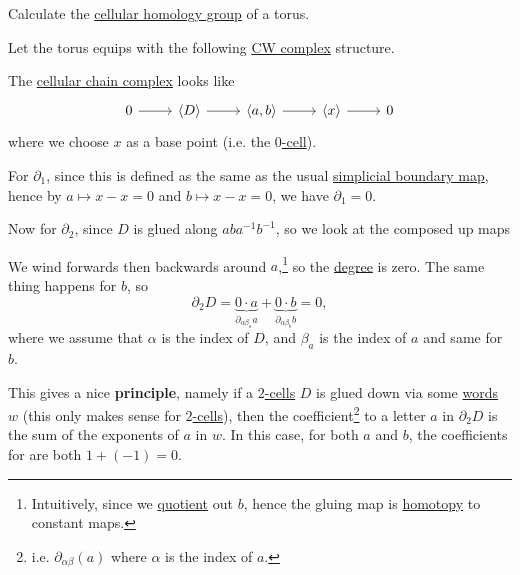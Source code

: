\begin{eg}
	Calculate the \hyperref[def:cellular-homology-group]{cellular homology group} of a torus.
\end{eg}
\begin{explanation}
	Let the torus equips with the following \hyperref[def:CW-Complex]{CW complex} structure.
	\begin{figure}[H]
		\centering
		\label{fig:eg:lec31:CW-complex-torus}
	\end{figure}

	The \hyperref[def:cellular-chain-complex]{cellular chain complex} looks like
	\[
		\begin{tikzcd}
			0 & {\left<D\right>} & {\left<a, b\right>} & {\left<x\right>} & 0
			\arrow[from=1-1, to=1-2]
			\arrow[from=1-2, to=1-3]
			\arrow[from=1-3, to=1-4]
			\arrow[from=1-4, to=1-5]
		\end{tikzcd}
	\]
	where we choose \(x\) as a base point (i.e. the \hyperref[def:cell]{\(0\)-cell}).

	For \(\partial _1\), since this is defined as the same as the usual \hyperref[def:boundary-homomorphism]{simplicial boundary map},
	hence by \(a \mapsto x - x = 0\) and \(b \mapsto x - x = 0\), we have \(\partial_1 = 0\).

	Now for \(\partial _2\), since \(D\) is glued along \(aba^{-1}b^{-1}\), so we look at the composed up maps
	\begin{figure}[H]
		\centering
		\label{fig:eg:cellular-homology-calc-torus}
	\end{figure}
	We wind forwards then backwards around \(a\),\footnote{Intuitively, since we \hyperref[CW-complex-quotient]{quotient} out \(b\),
		hence the gluing map is \hyperref[def:homotopy]{homotopy} to constant maps.} so the \hyperref[def:degree]{degree} is zero.
	The same thing happens for \(b\), so
	\[
		\partial_2 D = \underbrace{0 \cdot a}_{\partial_{\alpha \beta_a }a} + \underbrace{0 \cdot b}_{\partial _{\alpha \beta_b } b} = 0,
	\]
	where we assume that \(\alpha\) is the index of \(D\), and \(\beta _a\) is the index of \(a\) and same for \(b\).

	This gives a nice \textbf{principle}, namely if a \hyperref[def:cell]{\(2\)-cells} \(D\) is glued down via some \hyperref[def:word]{words}
	\(w\) (this only makes sense for \hyperref[def:cell]{\(2\)-cells}), then the
	coefficient\footnote{i.e. \(\partial_{\alpha \beta } (a)\) where \(\alpha\) is the index of \(a\).} to a letter \(a\) in \(\partial_2 D\)
	is the sum of the exponents of \(a\) in \(w\).
	In this case, for both \(a\) and \(b\), the coefficients for are both \(1 + (-1) = 0\).


\end{explanation}
